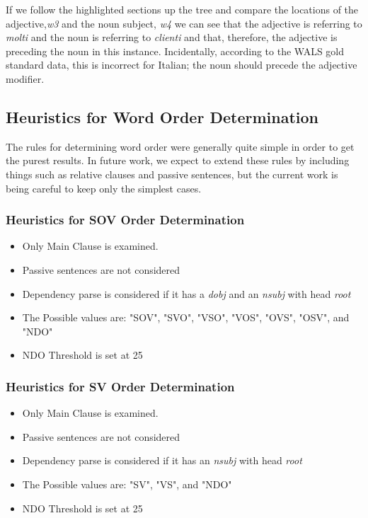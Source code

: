 \documentclass[]{article}
\begin{document}
If we follow the highlighted sections up the tree and compare the locations of the adjective,\textit{w3} and the noun subject, \textit{w4} we can see that the adjective is referring to \textit{molti} and the noun is referring to \textit{clienti} and that, therefore, the adjective is preceding the noun in this instance.  Incidentally, according to the WALS gold standard data, this is incorrect for Italian; the noun should precede the adjective modifier.


\subsection{Heuristics for Word Order Determination}
The rules for determining word order were generally quite simple in order to get the purest results.  In future work, we expect to extend these rules by including things such as relative clauses and passive sentences, but the current work is being careful to keep only the simplest cases.

\subsubsection{Heuristics for SOV Order Determination}
\begin{itemize}
    \item Only Main Clause is examined.
    \item Passive sentences are not considered
    \item Dependency parse is considered if it has a \textit{dobj} and an \textit{nsubj} with head \textit{root}
    \item The Possible values are: "SOV", "SVO", "VSO", "VOS", "OVS", "OSV", and "NDO"
    \item NDO Threshold is set at 25%
\end{itemize}
\subsubsection{Heuristics for SV Order Determination}
\begin{itemize}
    \item Only Main Clause is examined.
    \item Passive sentences are not considered
    \item Dependency parse is considered if it has an \textit{nsubj} with head \textit{root}
    \item The Possible values are: "SV", "VS", and "NDO"
    \item NDO Threshold is set at 25%
\end{itemize}
\end{document}
